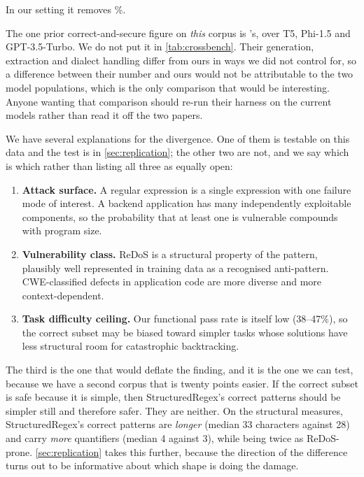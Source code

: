 \documentclass[11pt]{article}
\begin{document}
In our setting it removes \vulngivencorrect{}\%.

The one prior correct-and-secure figure on \emph{this} corpus is
\citet{siddiq2024regexeval}'s, over T5, Phi-1.5 and GPT-3.5-Turbo. We do not
put it in \cref{tab:crossbench}. Their generation, extraction and dialect
handling differ from ours in ways we did not control for, so a difference
between their number and ours would not be attributable to the two model
populations, which is the only comparison that would be interesting. Anyone
wanting that comparison should re-run their harness on the current models
rather than read it off the two papers.

We have several explanations for the divergence. One of them is testable on
this data and the test is in \cref{sec:replication}; the other two are not,
and we say which is which rather than listing all three as equally open:

\begin{enumerate}
\item \textbf{Attack surface.} A regular expression is a single expression
with one failure mode of interest. A backend application has many
independently exploitable components, so the probability that at least one is
vulnerable compounds with program size.
\item \textbf{Vulnerability class.} ReDoS is a structural property of the
pattern, plausibly well represented in training data as a recognised
anti-pattern. CWE-classified defects in application code are more diverse and
more context-dependent.
\item \textbf{Task difficulty ceiling.} Our functional pass rate is itself low
(38--47\%), so the correct subset may be biased toward simpler tasks whose
solutions have less structural room for catastrophic backtracking.
\end{enumerate}

The third is the one that would deflate the finding, and it is the one we can
test, because we have a second corpus that is twenty points easier. If the
correct subset is safe because it is simple, then StructuredRegex's correct
patterns should be simpler still and therefore safer. They are neither. On the
structural measures, StructuredRegex's correct patterns are \emph{longer}
(median 33 characters against 28) and carry \emph{more} quantifiers (median 4
against 3), while being twice as ReDoS-prone.
\cref{sec:replication} takes this further, because the direction of the
difference turns out to be informative about which shape is doing the damage.
\end{document}
